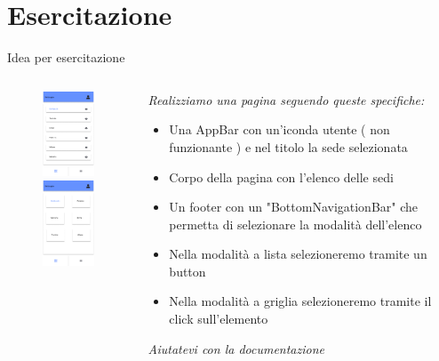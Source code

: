\documentclass{../libs/presentation_format}
\begin{document}

\section{Esercitazione}
\begin{frame}{Idea per esercitazione}
	\begin{minipage}[0.2\textheight]{\textwidth}
		\begin{columns}[T]
			\begin{column}{0.4\textwidth}
				\begin{figure}[htpb]
					\centering
					\includegraphics[width=2cm]{../libs/Home - List-1}
					\includegraphics[width=2cm]{../libs/Home - Grid-1}
				\end{figure}
			\end{column}
			\begin{column}{0.6\textwidth}
				\emph{Realizziamo una pagina seguendo queste specifiche:}
				\newline
				\begin{itemize}
					\item Una AppBar con un'iconda utente ( non funzionante ) e nel titolo la sede selezionata
					\item Corpo della pagina con l'elenco delle sedi
					\item Un footer con un "BottomNavigationBar" che permetta di selezionare la modalità dell'elenco
					\item Nella modalità a lista selezioneremo tramite un button
					\item Nella modalità a griglia selezioneremo tramite il click sull'elemento
				\end{itemize}
				\emph{Aiutatevi con la documentazione}
			\end{column}
		\end{columns}
	\end{minipage}
\end{frame}
\end{document}
